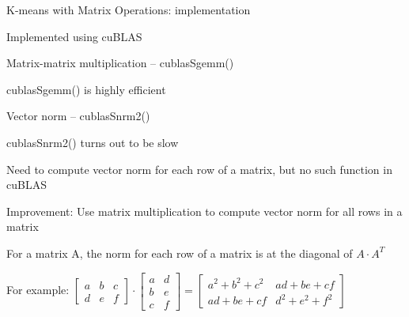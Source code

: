 \documentclass[
nopagebreaks,
style=klope,
fleqn]{powerdot}
\begin{document}
\begin{slide}{K-means with Matrix Operations: implementation}
  \begin{compactitem}
  \item{Implemented using cuBLAS}
  \item{Matrix-matrix multiplication -- cublasSgemm()}
    \begin{compactitem}
    \item{cublasSgemm() is highly efficient}
    \end{compactitem}
  \item{Vector norm -- cublasSnrm2()}
    \begin{compactitem}
    \item{cublasSnrm2() turns out to be slow}
    \item{Need to compute vector norm for each row of a matrix, but no such function in cuBLAS}
    \end{compactitem}
  \item{Improvement: Use matrix multiplication to compute vector norm for all rows in a matrix
    \begin{compactitem}
    \item{For a matrix A, the norm for each row of a matrix is at the diagonal of $A \cdot A^T$}
    \item{For example: 
      $
      \begin{bmatrix}
        a & b & c\\
        d & e & f
      \end{bmatrix}
      \cdot
      \begin{bmatrix}
        a & d \\
        b & e \\
        c & f
      \end{bmatrix}
      =
      \begin{bmatrix}
        a^2+b^2+c^2 & ad + be + cf \\
        ad + be + cf & d^2 + e^2 + f^2
      \end{bmatrix}
      $
    }  
    \end{compactitem}
  } 
  \end{compactitem}
\end{slide}
\end{document}

